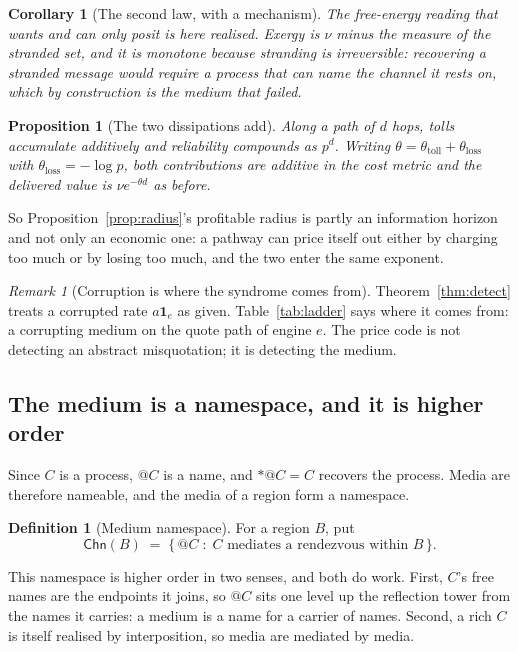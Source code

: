 \documentclass[11pt]{article}
\theoremstyle{plain}
\newtheorem{proposition}[theorem]{Proposition}
\newtheorem{corollary}[theorem]{Corollary}
\theoremstyle{definition}
\newtheorem{definition}[theorem]{Definition}
\theoremstyle{remark}
\newtheorem{remark}[theorem]{Remark}
\newcommand{\Chn}{\mathsf{Chn}}
\begin{document}
\begin{corollary}[The second law, with a mechanism]
The free-energy reading that \cite[Rmk.~6.2]{vtok} wants and can only
posit is here realised. Exergy is $\nu$ minus the measure of the stranded
set, and it is monotone because stranding is irreversible: recovering a
stranded message would require a process that can name the channel it rests
on, which by construction is the medium that failed.
\end{corollary}

\begin{proposition}[The two dissipations add]\label{prop:twotheta}
Along a path of $d$ hops, tolls accumulate additively and reliability
compounds as $p^d$. Writing
$\theta = \theta_{\mathrm{toll}} + \theta_{\mathrm{loss}}$ with
$\theta_{\mathrm{loss}} = -\log p$, both contributions are additive in the
cost metric and the delivered value is $\nu e^{-\theta d}$ as before.
\end{proposition}

So Proposition~\ref{prop:radius}'s profitable radius is partly an
information horizon and not only an economic one: a pathway can price
itself out either by charging too much or by losing too much, and the two
enter the same exponent.

\begin{remark}[Corruption is where the syndrome comes from]
Theorem~\ref{thm:detect} treats a corrupted rate $a\mathbf{1}_e$ as given.
Table~\ref{tab:ladder} says where it comes from: a corrupting medium on the
quote path of engine $e$. The price code is not detecting an abstract
misquotation; it is detecting the medium.
\end{remark}

\subsection{The medium is a namespace, and it is higher order}

Since $C$ is a process, $@C$ is a name, and $*@C = C$ recovers the process.
Media are therefore nameable, and the media of a region form a namespace.

\begin{definition}[Medium namespace]\label{def:med}
For a region $B$, put
\[
  \Chn(B) \;=\; \bigl\{\, @C \;:\; C \text{ mediates a rendezvous
  within } B \,\bigr\}.
\]
\end{definition}

This namespace is higher order in two senses, and both do work. First,
$C$'s free names are the endpoints it joins, so $@C$ sits one level up
the reflection tower from the names it carries: a medium is a name for a
carrier of names. Second, a rich $C$ is itself realised by interposition,
so media are mediated by media.
\end{document}

